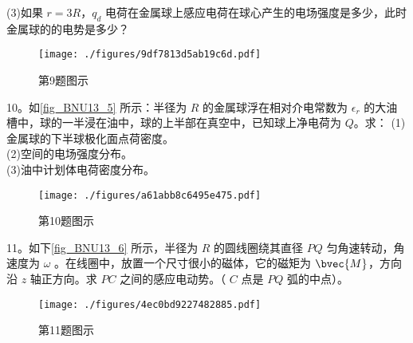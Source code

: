 (3)如果 $r=3R$，$q_d$ 电荷在金属球上感应电荷在球心产生的电场强度是多少，此时金属球的的电势是多少？
\begin{figure}[ht]
\centering
\texttt{[image: ./figures/9df7813d5ab19c6d.pdf]}
\caption{第9题图示} \label{fig_BNU13_4}
\end{figure}
10。如\autoref{fig_BNU13_5} 所示：半径为 $R$ 的金属球浮在相对介电常数为 $\epsilon_r$ 的大油槽中，球的一半浸在油中，球的上半部在真空中，已知球上净电荷为 $Q$。求：
(1)金属球的下半球极化面点荷密度。\\
(2)空间的电场强度分布。\\
(3)油中计划体电荷密度分布。
\begin{figure}[ht]
\centering
\texttt{[image: ./figures/a61abb8c6495e475.pdf]}
\caption{第10题图示} \label{fig_BNU13_5}
\end{figure}
11。如下\autoref{fig_BNU13_6} 所示，半径为 $R$ 的圆线圈绕其直径 $PQ$ 匀角速转动，角速度为 $\omega$ 。在线圈中，放置一个尺寸很小的磁体，它的磁矩为 $
\bvec{M}$，方向沿 $z$ 轴正方向。求 $PC$ 之间的感应电动势。（ $C$ 点是 $PQ$ 弧的中点）。
\begin{figure}[ht]
\centering
\texttt{[image: ./figures/4ec0bd9227482885.pdf]}
\caption{第11题图示} \label{fig_BNU13_6}
\end{figure}
